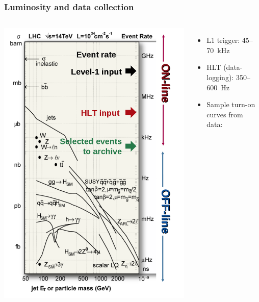 \documentclass[compress]{beamer}
\begin{document}
\begin{frame}
\end{frame}

\begin{frame}
\frametitle{Luminosity and data collection}
\begin{columns}
\mbox{\hspace{0.5 cm}\includegraphics[width=\linewidth]{triggerrates.png}}
\begin{itemize}
\item L1 trigger: 45--70~kHz
\item HLT (data-logging): \mbox{350--600~Hz\hspace{-1 cm}}
\item Sample turn-on curves from data:


\end{itemize}
\end{columns}
\end{frame}
\end{document}
